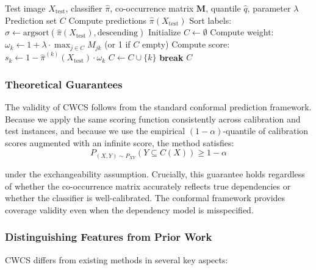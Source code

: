 \begin{algorithm*}[htbp]
\caption{CWCS Prediction}
\begin{algorithmic}[1]
\Require Test image $X_{\text{test}}$, classifier $\hat{\pi}$, co-occurrence matrix $\mathbf{M}$, quantile $\hat{q}$, parameter $\lambda$
\Ensure Prediction set $C$
\State Compute predictions $\hat{\pi}(X_{\text{test}})$
\State Sort labels: $\sigma \leftarrow \text{argsort}(\hat{\pi}(X_{\text{test}}), \text{descending})$
\State Initialize $C \leftarrow \emptyset$
    \State Compute weight: $\omega_k \leftarrow 1 + \lambda \cdot \max_{j \in C} M_{jk}$ (or 1 if $C$ empty)
    \State Compute score: $s_k \leftarrow 1 - \hat{\pi}^{(k)}(X_{\text{test}}) \cdot \omega_k$
        \State $C \leftarrow C \cup \{k\}$
    \Else
        \State \textbf{break}
    \EndIf
\EndFor
\State \Return $C$
\end{algorithmic}
\end{algorithm*}

\subsubsection{Theoretical Guarantees}

The validity of CWCS follows from the standard conformal prediction framework. Because we apply the same scoring function consistently across calibration and test instances, and because we use the empirical $(1-\alpha)$-quantile of calibration scores augmented with an infinite score, the method satisfies:
\begin{equation}
P_{(X,Y) \sim P_{XY}}(Y \subseteq C(X)) \geq 1 - \alpha
\end{equation}

under the exchangeability assumption. Crucially, this guarantee holds regardless of whether the co-occurrence matrix accurately reflects true dependencies or whether the classifier is well-calibrated. The conformal framework provides coverage validity even when the dependency model is misspecified.

\subsubsection{Distinguishing Features from Prior Work}

CWCS differs from existing methods in several key aspects:

